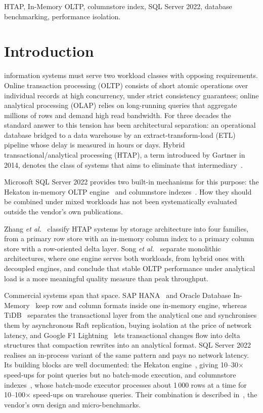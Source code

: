 \documentclass[10pt,conference,a4paper]{IEEEtran}
\begin{document}
\begin{IEEEkeywords}
HTAP, In-Memory OLTP, columnstore index, SQL Server 2022, database
benchmarking, performance isolation.
\end{IEEEkeywords}

\section{Introduction}
 information systems must serve two workload classes
with opposing requirements. Online transaction processing (OLTP) consists of
short atomic operations over individual records at high concurrency, under
strict consistency guarantees; online analytical processing (OLAP) relies on
long-running queries that aggregate millions of rows and demand high read
bandwidth. For three decades the standard answer to this tension has been
architectural separation: an operational database bridged to a data
warehouse by an extract-transform-load (ETL) pipeline whose delay is measured in
hours or days.
Hybrid transactional/analytical processing (HTAP), a term introduced by
Gartner in 2014, denotes the class of systems that aims to eliminate that
intermediary~\cite{ozcan2017}.

Microsoft SQL Server 2022 provides two built-in mechanisms for this purpose:
the Hekaton in-memory OLTP engine~\cite{diaconu2013} and columnstore
indexes~\cite{larson2013}. How they should be combined under mixed workloads
has not been systematically evaluated outside the vendor's own publications.

Zhang \emph{et al.}~\cite{zhang2024survey} classify HTAP systems by storage
architecture into four families, from a primary row store with an in-memory
column index to a primary column store with a row-oriented delta layer. Song
\emph{et al.}~\cite{song2024} separate monolithic architectures, where one
engine serves both workloads, from hybrid ones with decoupled engines, and
conclude that stable OLTP performance under analytical load is a more
meaningful quality measure than peak throughput.

Commercial systems span that space. SAP HANA~\cite{farber2012} and Oracle
Database In-Memory~\cite{lahiri2015} keep row and column formats inside one
in-memory engine, whereas TiDB~\cite{huang2020} separates the transactional
layer from the analytical one and synchronises them by asynchronous Raft
replication, buying isolation at the price of network latency, and Google F1
Lightning~\cite{yang2020} lets transactional changes flow into delta
structures that compaction rewrites into an analytical format. SQL Server 2022 realises an in-process variant of the
same pattern and pays no network latency. Its building blocks are well
documented: the Hekaton engine~\cite{diaconu2013}, giving 10--30$\times$
speed-ups for point queries but no batch-mode execution, and columnstore
indexes~\cite{larson2013}, whose batch-mode executor processes about 1\,000
rows at a time for 10--100$\times$ speed-ups on warehouse queries. Their
combination is described in~\cite{larson2015}, the vendor's own design and
micro-benchmarks.
\end{document}
